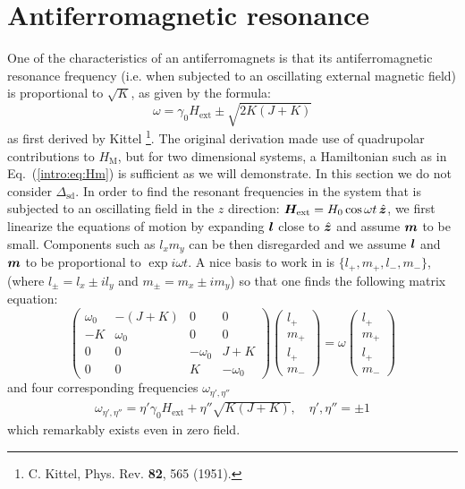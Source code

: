 \section{Antiferromagnetic resonance}
One of the characteristics of an antiferromagnets is that its antiferromagnetic resonance frequency (i.e. when subjected to an oscillating external magnetic field) is proportional to $\sqrt{K}$, as given by the formula:
\begin{equation}
    \omega = \gamma_0 H_\text{ext} \pm \sqrt{2K(J+K)}
\end{equation}
as first derived by Kittel \footnote{C. Kittel, Phys. Rev. \textbf{82}, 565 (1951).}. The original derivation made use of quadrupolar contributions to $H_\text{M}$, but for two dimensional systems, a Hamiltonian such as in Eq.~(\ref{intro:eq:Hm}) is sufficient as we will demonstrate. In this section we do not consider $\Delta_\text{sd}$. In order to find the resonant frequencies in the system that is subjected to an oscillating field in the $z$ direction: $\boldsymbol{H}_\text{ext} = H_0 \cos \omega t\,\hat{\boldsymbol{z}}$, we first linearize the equations of motion by expanding $\boldsymbol{l}$ close to $\hat{\boldsymbol{z}}$ and assume $\boldsymbol{m}$ to be small. Components such as $l_x m_y$ can be then disregarded and we assume $\boldsymbol{l}$ and $\boldsymbol{m}$ to be proportional to $\exp i \omega t$. A nice basis to work in is $\{{l}_+,{m}_+,{l}_-,{m}_- \}$, (where ${l}_\pm = l_x\pm i l_y$ and ${m}_\pm = m_x\pm i m_y$) so that one finds the following matrix equation:
\begin{equation}
    \begin{pmatrix}
    \omega_0 & -(J+K) & 0 & 0 \\
    -K & \omega_0 & 0 & 0 \\
    0 & 0 & -\omega_0 & J+K \\
    0 & 0 & K & -\omega_0
    \end{pmatrix}
    \begin{pmatrix}
    l_{+}\\
    m_{+}\\
    l_{+}\\
    m_{-}
    \end{pmatrix}
    =\omega 
    \begin{pmatrix}
    l_{+}\\
    m_{+}\\
    l_{+}\\
    m_{-}
    \end{pmatrix}
\end{equation}
and four corresponding frequencies $\omega_{\eta',\eta''}$  
\begin{align}
    \omega_{\eta',\eta''} = \eta' \gamma_0 H_\text{ext} +\eta'' \sqrt{K(J+K)}, \quad \eta',\eta''=\pm1
\end{align}
which remarkably exists even in zero field. 

